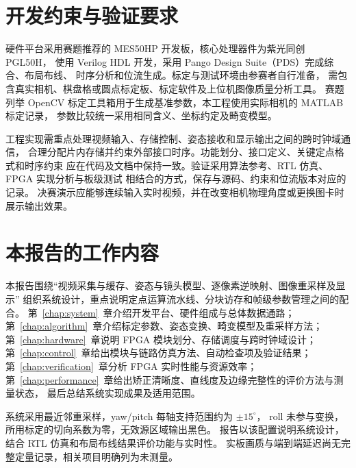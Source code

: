 \section{开发约束与验证要求}
硬件平台采用赛题推荐的 MES50HP 开发板，核心处理器件为紫光同创 PGL50H，
使用 Verilog HDL 开发，采用 Pango Design Suite（PDS）完成综合、布局布线、
时序分析和位流生成。标定与测试环境由参赛者自行准备，
需包含真实相机、棋盘格或圆点标定板、标定软件及上位机图像质量分析工具。
赛题列举 OpenCV 标定工具箱用于生成基准参数，本工程使用实际相机的 MATLAB 标定记录，
参数比较统一采用相同含义、坐标约定及畸变模型。

工程实现需重点处理视频输入、存储控制、姿态接收和显示输出之间的跨时钟域通信，
合理分配片内存储并约束外部接口时序。功能划分、接口定义、关键定点格式和时序约束
应在代码及文档中保持一致。验证采用算法参考、RTL 仿真、FPGA 实现分析与板级测试
相结合的方式，保存与源码、约束和位流版本对应的记录。
决赛演示应能够连续输入实时视频，并在改变相机物理角度或更换图卡时展示输出效果。

\section{本报告的工作内容}
本报告围绕“视频采集与缓存、姿态与镜头模型、逐像素逆映射、图像重采样及显示”
组织系统设计，重点说明定点运算流水线、分块访存和帧级参数管理之间的配合。
第~\ref{chap:system}~章介绍开发平台、硬件组成与总体数据通路；
第~\ref{chap:algorithm}~章介绍标定参数、姿态变换、畸变模型及重采样方法；
第~\ref{chap:hardware}~章说明 FPGA 模块划分、存储调度与跨时钟域设计；
第~\ref{chap:control}~章给出模块与链路仿真方法、自动检查项及验证结果；
第~\ref{chap:verification}~章分析 FPGA 实时性能与资源效率；
第~\ref{chap:performance}~章给出矫正清晰度、直线度及边缘完整性的评价方法与测量状态，
最后总结系统实现成果及适用范围。

系统采用最近邻重采样，yaw/pitch 每轴支持范围约为 $\pm15^\circ$，
roll 未参与变换，所用标定的切向系数为零，无效源区域输出黑色。
报告以该配置说明系统设计，结合 RTL 仿真和布局布线结果评价功能与实时性。
实板画质与端到端延迟尚无完整定量记录，相关项目明确列为未测量\cite{project,current}。
